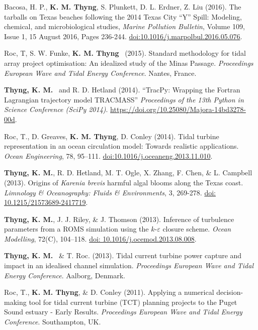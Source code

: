 \documentclass[10pt,letterpaper]{article}
\newcommand{\kmt}{\textbf{K. M. Thyng}}
\newcommand{\tkm}{\textbf{Thyng, K. M.}}
\renewenvironment{itemize}{
  \begin{list}{}{
    \setlength{\leftmargin}{1.5em}
    \setlength{\itemsep}{0.25em}
    \setlength{\parskip}{0pt}
    \setlength{\parsep}{0.25em}
  }
}{
  \end{list}
}
\begin{document}
\begin{itemize}
\item Bacosa, H. P., \kmt, S. Plunkett, D. L. Erdner, Z. Liu (2016). The tarballs on Texas beaches following the 2014 Texas City ``Y'' Spill: Modeling, chemical, and microbiological studies, \textit{Marine Pollution Bulletin}, Volume 109, Issue 1, 15 August 2016, Pages 236-244. \href{http://www.sciencedirect.com/science/article/pii/S0025326X16303964}{doi:10.1016/j.marpolbul.2016.05.076}.

\item Roc, T, S. W. Funke, \kmt~ (2015). Standard methodology for tidal array project optimisation: An idealized study of the Minas Passage. \textit{Proceedings European Wave and Tidal Energy Conference}. Nantes, France.

\item \tkm~ and R. D. Hetland (2014). ``TracPy: Wrapping the Fortran Lagrangian trajectory model TRACMASS'' \textit{Proceedings of the 13th Python in Science Conference (SciPy 2014)}. \href{http://conference.scipy.org/proceedings/scipy2014/pdfs/thyng.pdf}{\url{https://doi.org/10.25080/Majora-14bd3278-00d}}.

\item Roc, T., D. Greaves, \kmt, D. Conley (2014). Tidal turbine representation in an ocean circulation model: Towards realistic applications. \textit{Ocean Engineering}, 78, 95--111. \href{http://dx.doi.org/10.1016/j.oceaneng.2013.11.010}{doi:10.1016/j.oceaneng.2013.11.010}.

\item \tkm, R. D. Hetland, M. T. Ogle, X. Zhang, F. Chen, \& L. Campbell (2013). Origins of \textit{Karenia brevis} harmful algal blooms along the Texas coast. \textit{Limnology \& Oceanography: Fluids \& Environments}, 3, 269-278. \href{http://lofe.dukejournals.org/content/3/269.full}{doi: 10.1215/21573689-2417719}.

\item \tkm, J. J. Riley, \& J. Thomson (2013). Inference of turbulence parameters from a ROMS simulation using the $k$-$\varepsilon$ closure scheme. \textit{Ocean Modelling}, 72(C), 104--118. \href{http://www.sciencedirect.com/science/article/pii/S1463500313001613}{doi: 10.1016/j.ocemod.2013.08.008}.

\item \tkm~ \& T. Roc. (2013). Tidal current turbine power capture and impact in an idealised channel simulation. \textit{Proceedings European Wave and Tidal Energy Conference}. Aalborg, Denmark.

\item Roc, T., \kmt, \& D. Conley (2011). Applying a numerical decision-making tool for tidal current turbine (TCT) planning projects to the Puget Sound estuary - Early Results. \textit{Proceedings European Wave and Tidal Energy Conference}. Southampton, UK.


\end{itemize}
\end{document}

